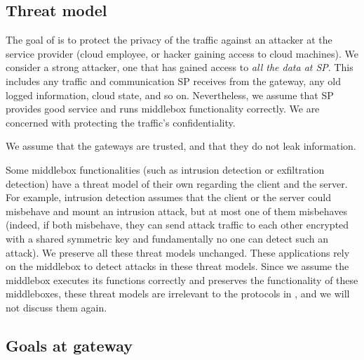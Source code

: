 




\subsection{Threat model}

The goal of \sys is to protect the privacy of the traffic against an attacker at the service provider  
(cloud employee, or hacker gaining access to cloud machines). 
We consider a strong  attacker, one that has gained access to {\em all the data at SP}.
This includes any traffic and communication SP receives from the 
gateway, any old logged information, cloud state, and so on. Nevertheless, we assume that 
SP provides good service and runs middlebox functionality correctly.  We are concerned with 
protecting  the traffic's confidentiality.

We assume that the gateways are trusted, and that they do not leak information.


Some middlebox functionalities (such as intrusion detection or exfiltration detection) have a threat model
of their own regarding the client and the server. For example, intrusion detection assumes that 
the client or the server could misbehave and mount an intrusion attack, but at most one of them misbehaves~\cite{Bro}  
(indeed, if both misbehave, they can send attack traffic to each other encrypted with a shared symmetric key and fundamentally
no one can detect such an attack).  We preserve all these threat models unchanged. These applications rely
on the middlebox to detect attacks in these threat models. Since we assume the middlebox executes
its functions correctly and \sys preserves the functionality of these middleboxes, 
these threat models are irrelevant to the protocols in \sys, and we will not discuss them again. 


\subsection{Goals at gateway}

